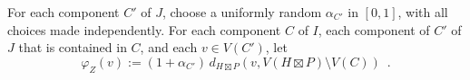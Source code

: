 \documentclass{patmorin}
\renewcommand{\ge}{\geqslant}
\begin{document}
%
%
%

For each component $C'$ of $J$, choose a uniformly random $\alpha_{C'}$ in $[0,1]$, with all choices made independently.
For each component $C$ of $I$, each component of $C'$ of $J$ that is contained in $C$, and each $v \in V(C')$, let
\[
  \varphi_{Z}(v):=(1+\alpha_{C'})\,d_{H\boxtimes P}(v,V(H\boxtimes P)\setminus V(C)) \enspace .
\]
\end{document}
